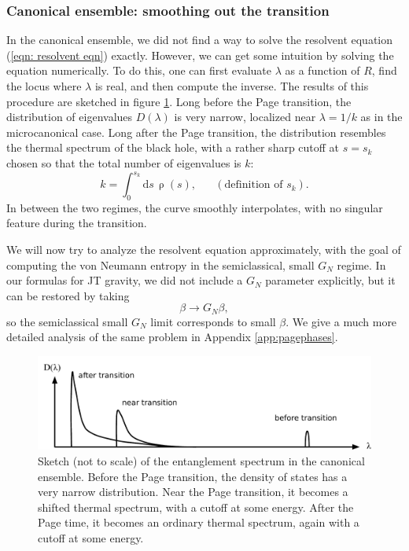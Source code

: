 \documentclass[11pt]{article}
\newcommand{\be}{\begin{equation}}
\newcommand{\ee}{\end{equation}}
\numberwithin{equation}{section}
\begin{document}
\subsubsection{Canonical ensemble: smoothing out the transition}
In the canonical ensemble, we did not find a way to solve the resolvent equation (\ref{eqn: resolvent eqn}) exactly. However, we can get some intuition by solving the equation numerically. To do this, one can first evaluate $\lambda$ as a function of $R$, find the locus where $\lambda$ is real, and then compute the inverse. The results of this procedure are sketched in figure \ref{fig:densitydistribution}. Long before the Page transition, the distribution of eigenvalues $D(\lambda)$ is very narrow, localized near $\lambda = 1/k$ as in the microcanonical case. Long after the Page transition, the distribution resembles the thermal spectrum of the black hole, with a rather sharp cutoff at $s = s_k$ chosen so that the total number of eigenvalues is $k$:
\be \label{eq:defskmaintext}
k = \int_0^{s_k}\mathrm{d}s\,{\uprho}(s), \hspace{20pt} (\text{definition of $s_k$}).
\ee
In between the two regimes, the curve smoothly interpolates, with no singular feature during the transition.

We will now try to analyze the resolvent equation approximately, with the goal of computing the von Neumann entropy in the semiclassical, small $G_N$ regime. In our formulas for JT gravity, we did not include a $G_N$ parameter explicitly, but it can be restored by taking
\be
\beta \rightarrow  G_N \beta,
\ee
so the semiclassical small $G_N$ limit corresponds to small $\beta$. We give a much more detailed analysis of the same problem in Appendix \ref{app:pagephases}.
\begin{figure}[t]
\centering
	\includegraphics[scale=0.65]{images/densitydistribution2.pdf}
	\caption{Sketch (not to scale) of the entanglement spectrum in the canonical ensemble. Before the Page transition, the density of states has a very narrow distribution. Near the Page transition, it becomes a shifted thermal spectrum, with a cutoff at some energy. After the Page time, it becomes an ordinary thermal spectrum, again with a cutoff at some energy.}
	\label{fig:densitydistribution}
\end{figure}
\end{document}

